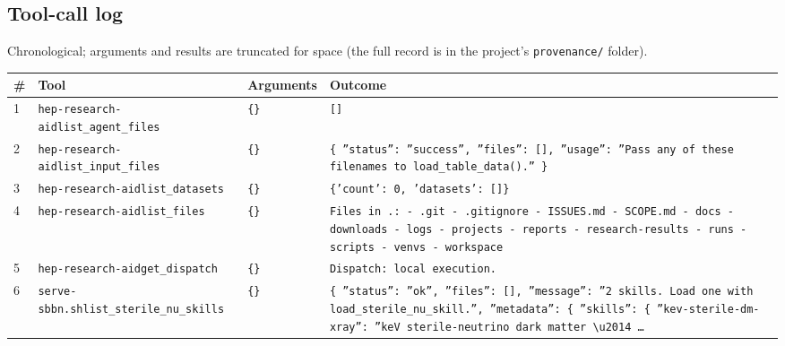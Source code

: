 \documentclass[11pt,a4paper]{article}
\begin{document}
\subsection{Tool-call log}
Chronological; arguments and results are truncated for space (the full record is in the project's \texttt{provenance/} folder).
\begin{longtable}{@{}p{}p{}p{}p{}@{}}
\toprule \# & Tool & Arguments & Outcome \\ \midrule \endhead
1 & \texttt{hep-research-aid}\newline\texttt{list\_\allowbreak{}agent\_\allowbreak{}files} & \texttt{\{\}\allowbreak{}} & \texttt{[]\allowbreak{}} \\
2 & \texttt{hep-research-aid}\newline\texttt{list\_\allowbreak{}input\_\allowbreak{}files} & \texttt{\{\}\allowbreak{}} & \texttt{\{   ''status'':\allowbreak{} ''success'',\allowbreak{}   ''files'':\allowbreak{} []\allowbreak{},\allowbreak{}   ''usage'':\allowbreak{} ''Pass any of these filenames to load\_\allowbreak{}table\_\allowbreak{}data()\allowbreak{}.'' \}\allowbreak{}} \\
3 & \texttt{hep-research-aid}\newline\texttt{list\_\allowbreak{}datasets} & \texttt{\{\}\allowbreak{}} & \texttt{\{'count':\allowbreak{} 0,\allowbreak{} 'datasets':\allowbreak{} []\allowbreak{}\}\allowbreak{}} \\
4 & \texttt{hep-research-aid}\newline\texttt{list\_\allowbreak{}files} & \texttt{\{\}\allowbreak{}} & \texttt{Files in .:\allowbreak{}   - .git   - .gitignore   - ISSUES.md   - SCOPE.md   - docs   - downloads   - logs   - projects   - reports   - research-results   - runs   - scripts   - venvs   - workspace} \\
5 & \texttt{hep-research-aid}\newline\texttt{get\_\allowbreak{}dispatch} & \texttt{\{\}\allowbreak{}} & \texttt{Dispatch:\allowbreak{} local execution.} \\
6 & \texttt{serve-sbbn.sh}\newline\texttt{list\_\allowbreak{}sterile\_\allowbreak{}nu\_\allowbreak{}skills} & \texttt{\{\}\allowbreak{}} & \texttt{\{   ''status'':\allowbreak{} ''ok'',\allowbreak{}   ''files'':\allowbreak{} []\allowbreak{},\allowbreak{}   ''message'':\allowbreak{} ''2 skills. Load one with load\_\allowbreak{}sterile\_\allowbreak{}nu\_\allowbreak{}skill.'',\allowbreak{}   ''metadata'':\allowbreak{} \{     ''skills'':\allowbreak{} \{       ''kev-sterile-dm-xray'':\allowbreak{} ''keV sterile-neutrino dark matter \textbackslash{}\allowbreak{}u2014 \ldots{}\allowbreak{}} \\

\end{longtable}
\end{document}
